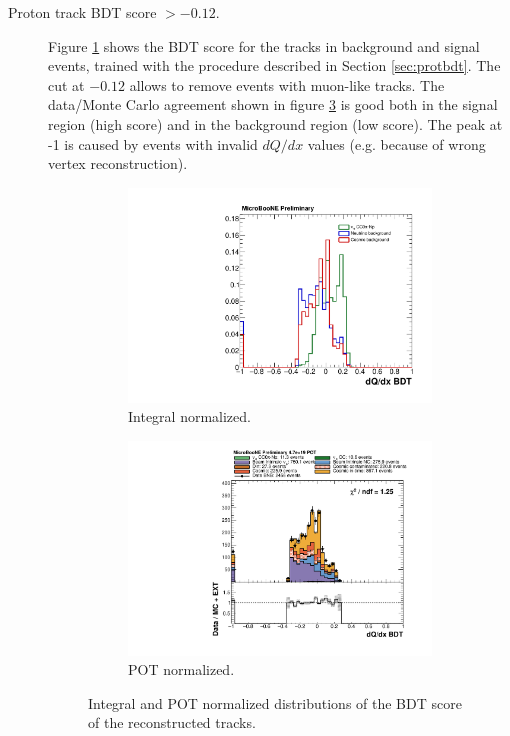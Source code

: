 \begin{description}
\item[Proton track BDT score $> -0.12$.] Figure \ref{fig:bdt_norm} shows the BDT score for the tracks in background and signal events, trained with the procedure described in Section \ref{sec:protbdt}. The cut at $-0.12$ allows to remove events with muon-like tracks. The data/Monte Carlo agreement shown in figure \ref{fig:bdt_pot} is good both in the signal region (high score) and in the background region (low score). The peak at -1 is caused by events with invalid $dQ/dx$ values (e.g. because of wrong vertex reconstruction).

\begin{figure}[htbp]
\centering
  \begin{subfigure}{0.45\textwidth}
    \includegraphics[width=\linewidth]{figures/h_dqdx_bdt_norm.pdf}
    \caption{Integral normalized.} \label{fig:bdt_norm}
  \end{subfigure}
    \begin{subfigure}{0.45\textwidth}
    \includegraphics[width=\linewidth]{figures/h_dqdx_bdt.pdf}
    \caption{POT normalized.} \label{fig:bdt_pot}
  \end{subfigure}
  \caption{Integral and POT normalized distributions of the BDT score of the reconstructed tracks.}
\end{figure}



\end{description}

